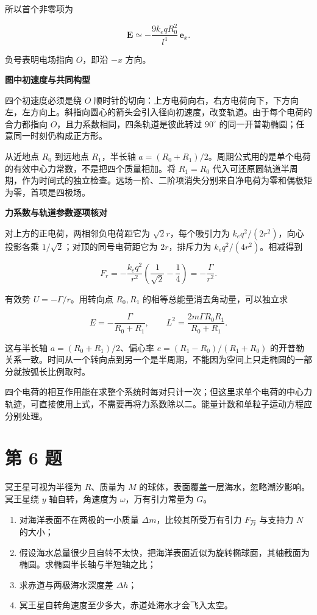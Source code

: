 \documentclass[12pt,a4paper,UTF8]{ctexart}
\newcommand{\tightlist}{\setlength{\itemsep}{0pt}\setlength{\parskip}{0pt}}
\begin{document}
所以首个非零项为

\[
\boxed{
\bm E
\simeq-\frac{9k_eqR_0^2}{l^4}\,\bm e_x
}.
\tag{13}
\]

负号表明电场指向 \(O\)，即沿 \(-x\) 方向。

\textbf{图中初速度与共同构型}

四个初速度必须是绕 \(O\)
顺时针的切向：上方电荷向右，右方电荷向下，下方向左，左方向上。斜指向圆心的箭头会引入径向初速度，改变轨道。由于每个电荷的合力都指向
\(O\)，且力系数相同，四条轨道是彼此转过 \(90^\circ\)
的同一开普勒椭圆；任意同一时刻仍构成正方形。

从近地点 \(R_0\) 到远地点 \(R_1\)，半长轴
\(a=(R_0+R_1)/2\)。周期公式用的是单个电荷的有效中心力常数，不是把四个质量相加。将
\(R_1=R_0\)
代入可还原圆轨道半周期，作为时间式的独立检查。远场一阶、二阶项消失分别来自净电荷为零和偶极矩为零，首项是四极场。

\textbf{力系数与轨道参数逐项核对}

对上方的正电荷，两相邻负电荷距它为 \(\sqrt2r\)，每个吸引力为
\(k_eq^2/(2r^2)\)，向心投影各乘 \(1/\sqrt2\)；对顶的同号电荷距它为
\(2r\)，排斥力为 \(k_eq^2/(4r^2)\)。相减得到

\[F_r=-\frac{k_eq^2}{r^2}\left(\frac1{\sqrt2}-\frac14\right)=-\frac\Gamma{r^2}.\]

有效势 \(U=-\Gamma/r\)。用转向点 \(R_0,R_1\)
的相等总能量消去角动量，可以独立求

\[E=-\frac{\Gamma}{R_0+R_1},\qquad L^2=\frac{2m\Gamma R_0R_1}{R_0+R_1}.\]

这与半长轴 \(a=(R_0+R_1)/2\)、偏心率 \(e=(R_1-R_0)/(R_1+R_0)\)
的开普勒关系一致。时间从一个转向点到另一个是半周期，不能因为空间上只走椭圆的一部分就按弧长比例取时。

四个电荷的相互作用能在求整个系统时每对只计一次；但这里求单个电荷的中心力轨迹，可直接使用上式，不需要再将力系数除以二。能量计数和单粒子运动方程应分别处理。

\newpage

\section{第 6 题}\label{ux7b2c-6-ux9898}

冥王星可视为半径为 \(R\)、质量为 \(M\)
的球体，表面覆盖一层海水，忽略潮汐影响。冥王星绕 \(y\) 轴自转，角速度为
\(\omega\)，万有引力常量为 \(G\)。

\begin{enumerate}
\def\labelenumi{\arabic{enumi}.}
\tightlist
\item
  对海洋表面不在两极的一小质量 \(\Delta m\)，比较其所受万有引力
  \(F_{\text{万}}\) 与支持力 \(N\) 的大小；
\item
  假设海水总量很少且自转不太快，把海洋表面近似为旋转椭球面，其轴截面为椭圆。求椭圆半长轴与半短轴之比；
\item
  求赤道与两极海水深度差 \(\Delta h\)；
\item
  冥王星自转角速度至少多大，赤道处海水才会飞入太空。
\end{enumerate}
\end{document}
